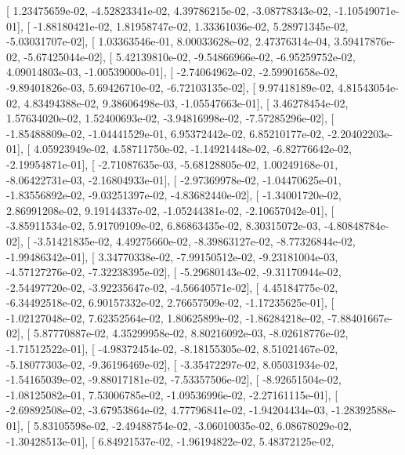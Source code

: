 \documentclass{article}
\begin{document}
       [  1.23475659e-02,  -4.52823341e-02,   4.39786215e-02,
         -3.08778343e-02,  -1.10549071e-01],
       [ -1.88180421e-02,   1.81958747e-02,   1.33361036e-02,
          5.28971345e-02,  -5.03031707e-02],
       [  1.03363546e-01,   8.00033628e-02,   2.47376314e-04,
          3.59417876e-02,  -5.67425044e-02],
       [  5.42139810e-02,  -9.54866966e-02,  -6.95259752e-02,
          4.09014803e-03,  -1.00539000e-01],
       [ -2.74064962e-02,  -2.59901658e-02,  -9.89401826e-03,
          5.69426710e-02,  -6.72103135e-02],
       [  9.97418189e-02,   4.81543054e-02,   4.83494388e-02,
          9.38606498e-03,  -1.05547663e-01],
       [  3.46278454e-02,   1.57634020e-02,   1.52400693e-02,
         -3.94816998e-02,  -7.57285296e-02],
       [ -1.85488809e-02,  -1.04441529e-01,   6.95372442e-02,
          6.85210177e-02,  -2.20402203e-01],
       [  4.05923949e-02,   4.58711750e-02,  -1.14921448e-02,
         -6.82776642e-02,  -2.19954871e-01],
       [ -2.71087635e-03,  -5.68128805e-02,   1.00249168e-01,
         -8.06422731e-03,  -2.16804933e-01],
       [ -2.97369978e-02,  -1.04470625e-01,  -1.83556892e-02,
         -9.03251397e-02,  -4.83682440e-02],
       [ -1.34001720e-02,   2.86991208e-02,   9.19144337e-02,
         -1.05244381e-02,  -2.10657042e-01],
       [ -3.85911534e-02,   5.91709109e-02,   6.86863435e-02,
          8.30315072e-03,  -4.80848784e-02],
       [ -3.51421835e-02,   4.49275660e-02,  -8.39863127e-02,
         -8.77326844e-02,  -1.99486342e-01],
       [  3.34770338e-02,  -7.99150512e-02,  -9.23181004e-03,
         -4.57127276e-02,  -7.32238395e-02],
       [ -5.29680143e-02,  -9.31170944e-02,  -2.54497720e-02,
         -3.92235647e-02,  -4.56640571e-02],
       [  4.45184775e-02,  -6.34492518e-02,   6.90157332e-02,
          2.76657509e-02,  -1.17235625e-01],
       [ -1.02127048e-02,   7.62352564e-02,   1.80625899e-02,
         -1.86284218e-02,  -7.88401667e-02],
       [  5.87770887e-02,   4.35299958e-02,   8.80216092e-03,
         -8.02618776e-02,  -1.71512522e-01],
       [ -4.98372454e-02,  -8.18155305e-02,   8.51021467e-02,
         -5.18077303e-02,  -9.36196469e-02],
       [ -3.35472297e-02,   8.05031934e-02,  -1.54165039e-02,
         -9.88017181e-02,  -7.53357506e-02],
       [ -8.92651504e-02,  -1.08125082e-01,   7.53006785e-02,
         -1.09536996e-02,  -2.27161115e-01],
       [ -2.69892508e-02,  -3.67953864e-02,   4.77796841e-02,
         -1.94204434e-03,  -1.28392588e-01],
       [  5.83105598e-02,  -2.49488754e-02,  -3.06010035e-02,
          6.08678029e-02,  -1.30428513e-01],
       [  6.84921537e-02,  -1.96194822e-02,   5.48372125e-02,
\end{document}
